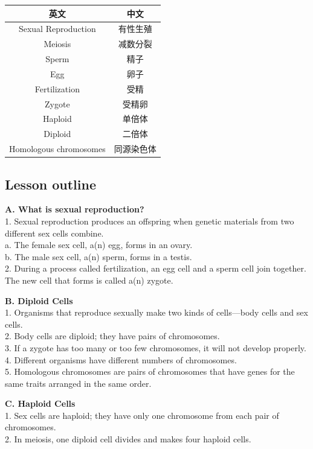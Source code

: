 \documentclass[
]{book}
\begin{document}
\begin{longtable}[]{@{}cc@{}}
\toprule\noalign{}
英文 & 中文 \\
\midrule\noalign{}
\endhead
\bottomrule\noalign{}
\endlastfoot
Sexual Reproduction & 有性生殖 \\
Meiosis & 减数分裂 \\
Sperm & 精子 \\
Egg & 卵子 \\
Fertilization & 受精 \\
Zygote & 受精卵 \\
Haploid & 单倍体 \\
Diploid & 二倍体 \\
Homologous chromosomes & 同源染色体 \\
\end{longtable}

\hypertarget{lesson-outline}{%
\subsection{Lesson outline}\label{lesson-outline}}

\textbf{A. What is sexual reproduction?}\\
1. {Sexual reproduction} produces an offspring when genetic materials from two
different sex cells combine.\\
a. The female sex cell, a(n) {egg}, forms in an ovary.\\
b. The male sex cell, a(n) {sperm}, forms in a testis.\\
2. During a process called {fertilization}, an egg cell and a sperm cell join together. The
new cell that forms is called a(n) {zygote}.

\textbf{B. Diploid Cells}\\
1. Organisms that reproduce sexually make two kinds of cells---{body} cells and sex cells.\\
2. Body cells are {diploid}; they have pairs of chromosomes.\\
3. If a zygote has too many or too few {chromosomes}, it will not develop properly.\\
4. Different organisms have different {numbers} of chromosomes.\\
5. {Homologous chromosomes} are pairs of chromosomes that have genes for the same traits arranged in the same order.

\textbf{C. Haploid Cells}\\
1. Sex cells are {haploid}; they have only one chromosome from each pair of chromosomes.\\
2. In {meiosis}, one diploid cell divides and makes four haploid cells.
\end{document}
